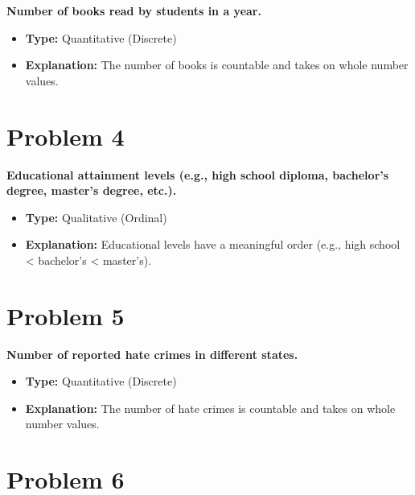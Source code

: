 \documentclass[
  letterpaper,
  DIV=11,
  numbers=noendperiod]{scrreprt}
\begin{document}

\textbf{Number of books read by students in a year.}

\begin{itemize}
\item
  \textbf{Type:} Quantitative (Discrete)
\item
  \textbf{Explanation:} The number of books is countable and takes on
  whole number values.
\end{itemize}

\section*{Problem 4}\label{problem-4-2}


\textbf{Educational attainment levels (e.g., high school diploma,
bachelor's degree, master's degree, etc.).}

\begin{itemize}
\item
  \textbf{Type:} Qualitative (Ordinal)
\item
  \textbf{Explanation:} Educational levels have a meaningful order
  (e.g., high school \textless{} bachelor's \textless{} master's).
\end{itemize}

\section*{Problem 5}\label{problem-5-2}


\textbf{Number of reported hate crimes in different states.}

\begin{itemize}
\item
  \textbf{Type:} Quantitative (Discrete)
\item
  \textbf{Explanation:} The number of hate crimes is countable and takes
  on whole number values.
\end{itemize}

\section*{Problem 6}\label{problem-6-2}

\end{document}
